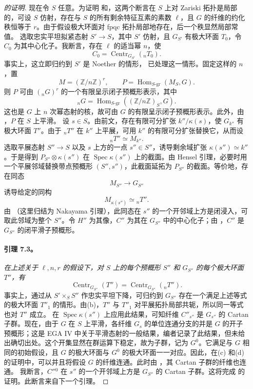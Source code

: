 \begin{proof}[ 的证明]
现在令 \(S\) 任意。为证明\textup{} 和\textup{}，这两个断言在 \(S\) 上对 Zariski 拓扑是局部的，可设 \(S\) 仿射，存在与 \(S\) 的所有剩余特征互素的素数 \(\ell\)，且 \(G\) 的纤维的约化秩恒等于 \(r\)。由于假设极大环面对 fpqc 拓扑局部地存在，后一个秩显然局部常值。
选取忠实平坦拟紧态射 \(S'\to S\)，其中 \(S'\) 仿射，且 \(G_{S'}\) 有极大环面 \(T_0\)，令 \(C_0\) 为其中心化子。我断言，存在 \(\ell\) 的适当幂 \(n\)，使
\[
  C_0=\operatorname{Centr}_{G_{S'}}({}_nT_0).
\]
事实上，这立即归约到 \(S'\) 是 Noether 的情形， 已处理这一情形。固定这样的 \(n\)，置
\[
  M=(\mathbb Z/n\mathbb Z)^r,
  \qquad
  P=\operatorname{Hom}_{S\text{-gr}}(M_S,G).
\]
则 \(P\) 可由 \(({}_nG)^r\) 的一个有限呈示闭子预概形表示，其中
\[
  {}_nG=\operatorname{Hom}_{S\text{-gr}}
    ((\mathbb Z/n\mathbb Z)_S,G).
\]
这也是 \(G\) 上 \(n\) 次幂态射的核，故可由 \(G\) 的有限呈示闭子预概形表示。此外，由 ，\(P\) 在 \(S\) 上平滑。
设 \(s\in S\)。由前文，存在有限可分扩张 \(k''/\kappa(s)\)，使 \(G_{k''}\) 有极大环面 \(T''\)。由于 \({}_nT''\) 在 \(k''\) 上平展，可用 \(k''\) 的有限可分扩张替换它，从而设
\[
  {}_nT''\simeq M_{k''}.
\]
选取平展态射 \(S''\to S\) 以及 \(s\) 上方的一点 \(s''\in S''\)，诱导剩余域扩张 \(\kappa(s'')\simeq k''\)。于是得到 \(P_{S''}\otimes\kappa(s'')\) 在 \(\operatorname{Spec}\kappa(s'')\) 上的截面。由 Hensel 引理，必要时用一个平展邻域替换带点预概形 \((S'',s'')\)，此截面延拓为 \(P_{S''}\) 的截面。等价地，存在同态
\[
  M_{S''}\longrightarrow G_{S''}
\]
诱导给定的同构
\[
  M_{\kappa(s'')}\simeq{}_nT''.
\]
由 （这里归结为 Nakayama 引理），此同态在 \(s''\) 的一个开邻域上方是闭浸入，可取此邻域为整个 \(S''\)。令 \(H''\) 为其像，\(C''\) 为其在 \(G_{S''}\) 中的中心化子；由 ，\(C''\) 是 \(G_{S''}\) 的闭平滑子预概形。
\paragraph{\textbf{引理 7.3。}}
\emph{在上述关于 \(\ell,n,r\) 的假设下，对 \(S\) 上的每个预概形 \(S''\) 和 \(G_{S''}\) 的每个极大环面 \(T''\)，有}
\[
  \operatorname{Centr}_{G_{S''}}(T'')
  =
  \operatorname{Centr}_{G_{S''}}({}_nT'').
\]
事实上，通过从 \(S'\times_S S''\) 作忠实平坦下降，可归约到 \(G_{S''}\) 存在一个满足上述等式的极大环面 \(T''_1\) 的情形。由\textup{(b)}，\(T''\) 与 \(T''_1\) 对平展拓扑局部共轭，所以同一等式也对 \(T''\) 成立。
在 \(\operatorname{Spec}\kappa(s'')\) 上应用此结果，可知纤维 \(C''_{s''}\) 是 \(G_{s''}\) 的 Cartan 子群。现在，由于 \(G\) 在 \(S\) 上平滑，各纤维 \(G_s\) 的单位连通分支的并是 \(G\) 的开子预概形；这是 EGA IV 中关于平滑态射的一般结果，编者记录了此结果，但未给出确切出处。这个开集显然在群运算下稳定，故为子群，记为 \(G^0\)。它满足与 \(G\) 相同的初始假设，且 \(G\) 的极大环面与 \(G^0\) 的极大环面一一对应。因此，在\textup{(c)} 和\textup{(d)} 的证明中，可以并且将假设 \(G\) 的纤维连通。此时由 ，其 Cartan 子群的纤维也连通。
我断言，\(C''{}^0\) 在 \(s''\) 的一个开邻域上方是 \(G_{S''}\) 的 Cartan 子群。这将完成\textup{} 的证明。此断言来自下一个引理。

\end{proof}
